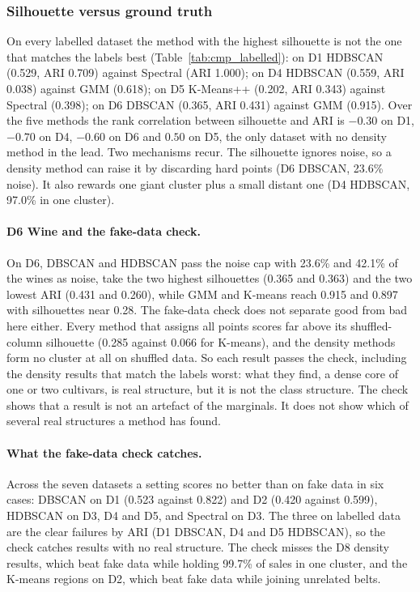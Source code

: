 \subsubsection{Silhouette versus ground truth}\label{sec:silhouette}
On every labelled dataset the method with the highest silhouette is not the one that matches the labels
best (Table~\ref{tab:cmp_labelled}): on D1 HDBSCAN (0.529, ARI 0.709) against Spectral (ARI 1.000); on D4
HDBSCAN (0.559, ARI 0.038) against GMM (0.618); on D5 K-Means++ (0.202, ARI 0.343) against Spectral
(0.398); on D6 DBSCAN (0.365, ARI 0.431) against GMM (0.915). Over the five methods the rank correlation
between silhouette and ARI is $-0.30$ on D1, $-0.70$ on D4, $-0.60$ on D6 and $0.50$ on D5, the only
dataset with no density method in the lead. Two mechanisms recur. The silhouette ignores noise, so a
density method can raise it by discarding hard points (D6 DBSCAN, 23.6\% noise). It also rewards one
giant cluster plus a small distant one (D4 HDBSCAN, 97.0\% in one cluster).

\habegin
\paragraph{D6 Wine and the fake-data check.} \hatag{}
On D6, DBSCAN and HDBSCAN pass the noise cap with 23.6\% and 42.1\% of the wines as noise, take the two
highest silhouettes (0.365 and 0.363) and the two lowest ARI (0.431 and 0.260), while GMM and K-means
reach 0.915 and 0.897 with silhouettes near 0.28. The fake-data check does not separate good from bad
here either. Every method that assigns all points scores far above its shuffled-column silhouette (0.285
against 0.066 for K-means), and the density methods form no cluster at all on shuffled data. So each
result passes the check, including the density results that match the labels worst: what they find, a
dense core of one or two cultivars, is real structure, but it is not the class structure. The check
shows that a result is not an artefact of the marginals. It does not show which of several real
structures a method has found.
\haend

\paragraph{What the fake-data check catches.} Across the seven datasets a setting scores no better than
on fake data in six cases: DBSCAN on D1 (0.523 against 0.822) and D2 (0.420 against 0.599), HDBSCAN on D3,
D4 and D5, and Spectral on D3. The three on labelled data are the clear failures by ARI (D1 DBSCAN, D4
and D5 HDBSCAN), so the check catches results with no real structure. The check misses the D8 density results, which beat fake data while holding
99.7\% of sales in one cluster, and the K-means regions on D2, which beat fake data while joining
unrelated belts.
